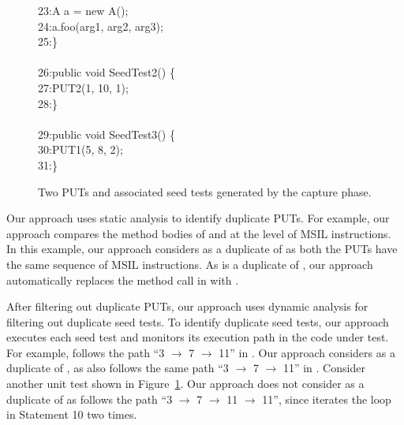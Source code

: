 \begin{figure}[t]
\begin{CodeOut}
23:\hspace*{0.2in}A a = new A();\\
24:\hspace*{0.2in}a.foo(arg1, arg2, arg3);\\
25:\}\\
\\
26:public void SeedTest2() \{\\
27:\hspace*{0.2in}PUT2(1, 10, 1);\\
28:\}\\
\\
29:public void SeedTest3() \{\\
30:\hspace*{0.2in}PUT1(5, 8, 2);\\
31:\}\\
\end{CodeOut}\vspace*{-2ex}
\caption{\label{fig:samplePutAndUT}Two PUTs and associated seed tests generated by the capture phase.}\vspace*{-2ex}
\end{figure}

Our approach uses static analysis to identify duplicate PUTs. For example, our approach compares the method bodies of  and  at the level of MSIL instructions. In this example, our approach considers  as a duplicate of  as both the PUTs have the same sequence of MSIL instructions. As  is a duplicate of , our approach automatically replaces the  method call in  with .

After filtering out duplicate PUTs, our approach uses dynamic analysis for filtering out duplicate seed tests. To identify duplicate seed tests, our approach executes each seed test and monitors its execution path in the code under test. For example,  follows the path ``3 $\rightarrow$ 7 $\rightarrow$ 11'' in . Our approach considers  as a duplicate of , as  also follows the same path ``3 $\rightarrow$ 7 $\rightarrow$ 11'' in . Consider another unit test  shown in Figure~\ref{fig:samplePutAndUT}. Our approach does not consider  as a duplicate of  as  follows the path ``3 $\rightarrow$ 7 $\rightarrow$ 11 $\rightarrow$ 11'', since  iterates the loop in Statement 10 two times.

